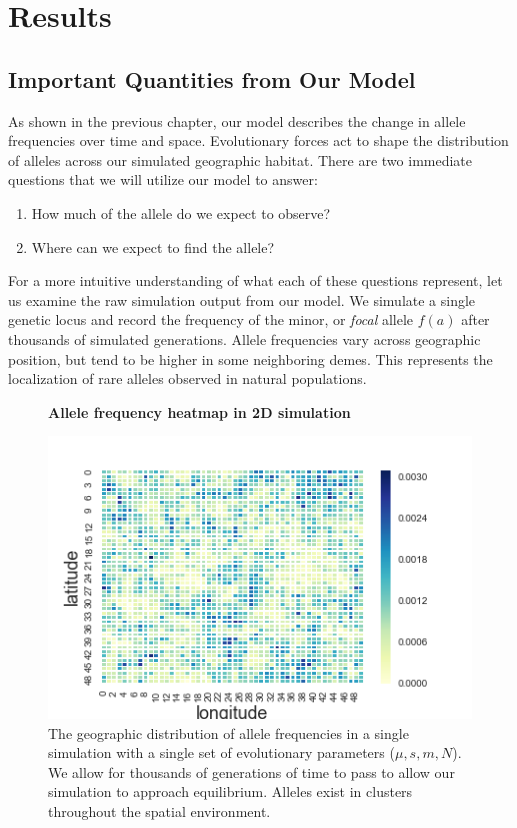 \chapter{Results}
\section{Important Quantities from Our Model}
As shown in the previous chapter, our model describes the change in allele frequencies over time and space. Evolutionary forces act to shape the distribution of alleles across our simulated geographic habitat. There are two immediate questions that we will utilize our model to answer:

\begin{enumerate}
    \item How much of the allele do we expect to observe?
    \item Where can we expect to find the allele?
\end{enumerate}


For a more intuitive understanding of what each of these questions represent, let us examine the raw simulation output from our model. We simulate a single genetic locus and record the frequency of the minor, or \textit{focal} allele $f(a)$ after thousands of simulated generations. Allele frequencies vary across geographic position, but tend to be higher in some neighboring demes. This represents the localization of rare alleles observed in natural populations. \cite{1k_genomes} \cite{geerlings_geographic_2018} \cite{marcus_visualizing_2017} 


\begin{figure}[h]
    \centering
    \textbf{Allele frequency heatmap in 2D simulation} \par \medskip
    \hspace*{+1.5cm}  
    \includegraphics[scale=1]{img/heatmap.png}
    \caption{The geographic distribution of allele frequencies in a single simulation with a single set of evolutionary parameters ($\mu,s,m,N$). We allow for thousands of generations of time to pass to allow our simulation to approach equilibrium. Alleles exist in clusters throughout the spatial environment.}
    \label{fig:geog_sim}
\end{figure}


